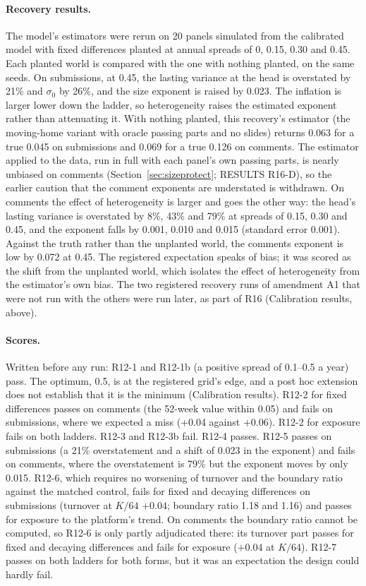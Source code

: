 \documentclass[10pt]{article}
\begin{document}
\paragraph{Recovery results.} The model's estimators were rerun on 20 panels simulated from the calibrated model with fixed differences planted at annual spreads of 0, 0.15, 0.30 and 0.45. Each planted world is compared with the one with nothing planted, on the same seeds. On submissions, at 0.45, the lasting variance at the head is overstated by 21\% and $\sigma_0$ by 26\%, and the size exponent is raised by 0.023. The inflation is larger lower down the ladder, so heterogeneity raises the estimated exponent rather than attenuating it. With nothing planted, this recovery's estimator (the moving-home variant with oracle passing parts and no slides) returns 0.063 for a true 0.045 on submissions and 0.069 for a true 0.126 on comments. The estimator applied to the data, run in full with each panel's own passing parts, is nearly unbiased on comments (Section~\ref{sec:sizeprotect}; RESULTS R16-D), so the earlier caution that the comment exponents are understated is withdrawn. On comments the effect of heterogeneity is larger and goes the other way: the head's lasting variance is overstated by 8\%, 43\% and 79\% at spreads of 0.15, 0.30 and 0.45, and the exponent falls by 0.001, 0.010 and 0.015 (standard error 0.001). Against the truth rather than the unplanted world, the comments exponent is low by 0.072 at 0.45. The registered expectation speaks of bias; it was scored as the shift from the unplanted world, which isolates the effect of heterogeneity from the estimator's own bias. The two registered recovery runs of amendment A1 that were not run with the others were run later, as part of R16 (Calibration results, above).
\paragraph{Scores.} Written before any run: R12-1 and R12-1b (a positive spread of 0.1--0.5 a year) pass. The optimum, 0.5, is at the registered grid's edge, and a post hoc extension does not establish that it is the minimum (Calibration results). R12-2 for fixed differences passes on comments (the 52-week value within 0.05) and fails on submissions, where we expected a miss (+0.04 against +0.06). R12-2 for exposure fails on both ladders. R12-3 and R12-3b fail. R12-4 passes. R12-5 passes on submissions (a 21\% overstatement and a shift of 0.023 in the exponent) and fails on comments, where the overstatement is 79\% but the exponent moves by only 0.015. R12-6, which requires no worsening of turnover and the boundary ratio against the matched control, fails for fixed and decaying differences on submissions (turnover at $K/64$ $+0.04$; boundary ratio 1.18 and 1.16) and passes for exposure to the platform's trend. On comments the boundary ratio cannot be computed, so R12-6 is only partly adjudicated there: its turnover part passes for fixed and decaying differences and fails for exposure ($+0.04$ at $K/64$). R12-7 passes on both ladders for both forms, but it was an expectation the design could hardly fail.
\end{document}

